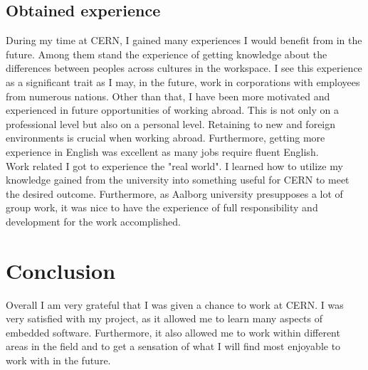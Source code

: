 

\section{Obtained experience}

\noindent During my time at CERN, I gained many experiences I would benefit from in the future. Among them stand the experience of getting knowledge about the differences between peoples across cultures in the workspace. I see this experience as a significant trait as I may, in the future, work in corporations with employees from numerous nations. Other than that, I have been more motivated and experienced in future opportunities of working abroad. This is not only on a professional level but also on a personal level. Retaining to new and foreign environments is crucial when working abroad. Furthermore, getting more experience in English was excellent as many jobs require fluent English.\\

\noindent Work related I got to experience the "real world". I learned how to utilize my knowledge gained from the university into something useful for CERN to meet the desired outcome. Furthermore, as Aalborg university presupposes a lot of group work, it was nice to have the experience of full responsibility and development for the work accomplished.

\chapter{Conclusion}

Overall I am very grateful that I was given a chance to work at CERN. I was very satisfied with my project, as it allowed me to learn many aspects of embedded software. Furthermore, it also allowed me to work within different areas in the field and to get a sensation of what I will find most enjoyable to work with in the future.\\

